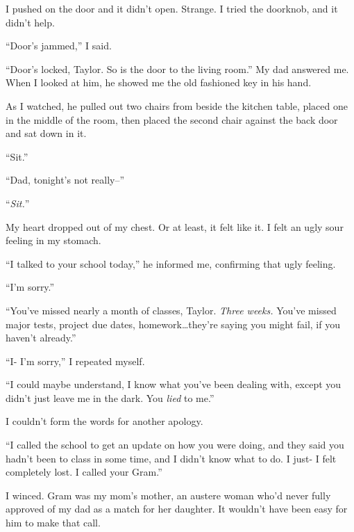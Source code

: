 I pushed on the door and it didn't open.  Strange.  I tried the doorknob, and it didn't help.



``Door's jammed,'' I said.



``Door's locked, Taylor.  So is the door to the living room.''  My dad answered me.  When I looked at him, he showed me the old fashioned key in his hand.



As I watched, he pulled out two chairs from beside the kitchen table, placed one in the middle of the room, then placed the second chair against the back door and sat down in it.



``Sit.''



``Dad, tonight's not really--''



``\emph{Sit.}''



My heart dropped out of my chest.  Or at least, it felt like it.  I felt an ugly sour feeling in my stomach.



``I talked to your school today,'' he informed me, confirming that ugly feeling.



``I'm sorry.''



``You've missed nearly a month of classes, Taylor.  \emph{Three weeks.  }You've missed major tests, project due dates, homework\ldots they're saying you might fail, if you haven't already.''



``I- I'm sorry,'' I repeated myself.



``I could maybe understand, I know what you've been dealing with, except you didn't just leave me in the dark.  You \emph{lied} to me.''



I couldn't form the words for another apology.



``I called the school to get an update on how you were doing, and they said you hadn't been to class in some time, and I didn't know what to do.  I just- I felt completely lost.  I called your Gram.''



I winced.  Gram was my mom's mother, an austere woman who'd never fully approved of my dad as a match for her daughter.  It wouldn't have been easy for him to make that call.



